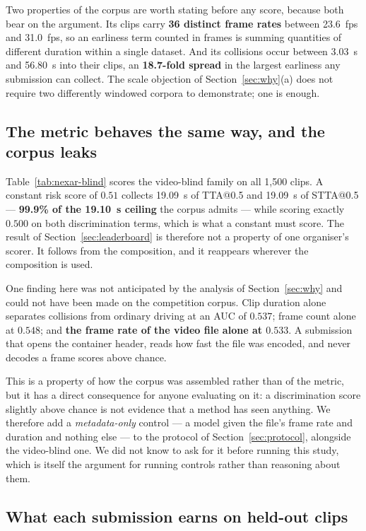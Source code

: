 Two properties of the corpus are worth stating before any score, because both
bear on the argument. Its clips carry \textbf{36 distinct frame rates} between
\SI{23.6}{fps} and \SI{31.0}{fps}, so an earliness term counted in frames is
summing quantities of different duration within a single dataset. And its
collisions occur between \SI{3.03}{\second} and \SI{56.80}{\second} into their
clips, an \textbf{18.7-fold spread} in the largest earliness any submission can
collect. The scale objection of Section~\ref{sec:why}(a) does not require two
differently windowed corpora to demonstrate; one is enough.

\subsection{The metric behaves the same way, and the corpus leaks}

Table~\ref{tab:nexar-blind} scores the video-blind family on all 1,500 clips. A
constant risk score of $0.51$ collects \SI{19.09}{\second} of TTA@0.5 and
\SI{19.09}{\second} of STTA@0.5 --- \textbf{99.9\% of the \SI{19.10}{\second}
ceiling} the corpus admits --- while scoring exactly $0.500$ on both
discrimination terms, which is what a constant must score. The result of
Section~\ref{sec:leaderboard} is therefore not a property of one organiser's
scorer. It follows from the composition, and it reappears wherever the
composition is used.

One finding here was not anticipated by the analysis of
Section~\ref{sec:why} and could not have been made on the competition corpus.
Clip duration alone separates collisions from ordinary driving at an AUC of
$0.537$; frame count alone at $0.548$; and \textbf{the frame rate of the video
file alone at $0.533$}. A submission that opens the container header, reads how
fast the file was encoded, and never decodes a frame scores above chance.

This is a property of how the corpus was assembled rather than of the metric,
but it has a direct consequence for anyone evaluating on it: a discrimination
score slightly above chance is not evidence that a method has seen anything.
We therefore add a \emph{metadata-only} control --- a model given the file's
frame rate and duration and nothing else --- to the protocol of
Section~\ref{sec:protocol}, alongside the video-blind one. We did not know to
ask for it before running this study, which is itself the argument for running
controls rather than reasoning about them.

\subsection{What each submission earns on held-out clips}

